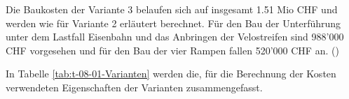 Die Baukosten der Variante 3 belaufen sich auf insgesamt 1.51 Mio CHF und werden wie für Variante 2 erläutert berechnet. Für den Bau der Unterführung unter dem Lastfall Eisenbahn und das Anbringen der Velostreifen sind 988'000 CHF vorgesehen und für den Bau der vier Rampen fallen 520'000 CHF an. (\cite{Baukosten2010}) 


In Tabelle \ref{tab:t-08-01-Varianten} werden die, für die Berechnung der Kosten verwendeten Eigenschaften der Varianten zusammengefasst.


\pagebreak

%

